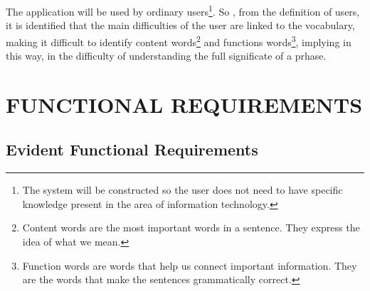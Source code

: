 \documentclass[11pt, twoside, a4paper]{book}
\begin{document}
			The application will be used by ordinary users\footnote{The system will be constructed so the user does not need to have specific knowledge present in the area of information technology.}. So , from the definition of users, it is identified that the main difficulties of the user are linked to the vocabulary, making it difficult to identify content words\footnote{Content words are the most important words in a sentence. They express the idea of what we mean.} and functions words\footnote{Function words are words that help us connect important information. They are the words that make the sentences grammatically correct.}, implying in this way, in the difficulty of understanding the full significate of a prhase.
			
	\chapter{FUNCTIONAL REQUIREMENTS}
	
		\section{Evident Functional Requirements}
		
\end{document}
